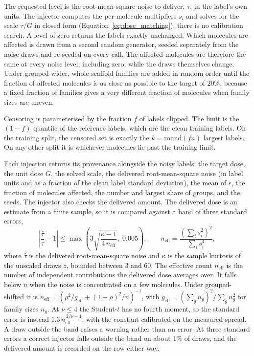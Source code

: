 The requested level is the root-mean-square noise to deliver, $\tau$, in the label's own units. The
injector computes the per-molecule multipliers $s_i$ and solves for the scale $\tau / G$ in closed
form (Equation~\ref{eq:dose_matching}); there is no calibration search. A level of zero returns the
labels exactly unchanged. Which molecules are affected is drawn from a second random generator,
seeded separately from the noise draws and re-seeded on every call. The affected molecules are
therefore the same at every noise level, including zero, while the draws themselves change. Under
grouped-wider, whole scaffold families are added in random order until the fraction of affected
molecules is as close as possible to the target of $20\%$, because a fixed fraction of families
gives a very different fraction of molecules when family sizes are uneven.

Censoring is parameterised by the fraction $f$ of labels clipped. The limit is the $(1-f)$ quantile
of the reference labels, which are the clean training labels. On the training split, the censored
set is exactly the $k = \mathrm{round}(fn)$ largest labels. On any other split it is whichever
molecules lie past the training limit.

Each injection returns its provenance alongside the noisy labels: the target dose, the unit dose
$G$, the solved scale, the delivered root-mean-square noise (in label units and as a fraction of the
clean label standard deviation), the mean of $\epsilon$, the fraction of molecules affected, the
number and largest share of groups, and the seeds. The injector also checks the delivered amount.
The delivered dose is an estimate from a finite sample, so it is compared against a band of three
standard errors,
\begin{equation}
\left|\frac{\hat{\tau}}{\tau} - 1\right| \le \max\!\left(3\sqrt{\frac{\kappa - 1}{4\,n_{\mathrm{eff}}}},\; 0.005\right),
\qquad
n_{\mathrm{eff}} = \frac{\left(\sum_i s_i^2\right)^2}{\sum_i s_i^4},
\label{eq:dose_tolerance}
\end{equation}
where $\hat{\tau}$ is the delivered root-mean-square noise and $\kappa$ is the sample kurtosis of the
unscaled draws $z$, bounded between 3 and 60. The effective count $n_{\mathrm{eff}}$ is the number of
independent contributions the delivered dose averages over. It falls below $n$ when the noise is
concentrated on a few molecules. Under grouped-shifted it is
$n_{\mathrm{eff}} = \left(\rho^2/g_{\mathrm{eff}} + (1-\rho)^2/n\right)^{-1}$, with
$g_{\mathrm{eff}} = \left(\sum_g n_g\right)^2 / \sum_g n_g^2$ for family sizes $n_g$. At
$\nu \le 4$ the Student-$t$ has no fourth moment, so the standard error is instead
$1.3\,n_{\mathrm{eff}}^{\,2/\nu - 1}$, with the constant calibrated on the measured spread. A draw
outside the band raises a warning rather than an error. At three standard errors a correct injector
falls outside the band on about $1\%$ of draws, and the delivered amount is recorded on the row
either way.

